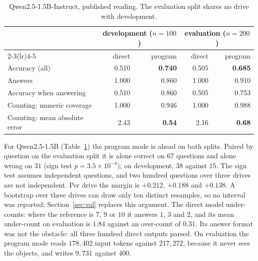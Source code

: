 \documentclass[11pt,a4paper]{article}
\begin{document}
\begin{table}[ht]
\centering
\small
\begin{tabular}{lrrrr}
\toprule
 & \multicolumn{2}{c}{development ($n{=}100$)} & \multicolumn{2}{c}{evaluation ($n{=}200$)} \\
\cmidrule(lr){2-3}\cmidrule(lr){4-5}
 & direct & program & direct & program \\
\midrule
Accuracy (all)            & 0.510 & \textbf{0.740} & 0.505 & \textbf{0.685} \\
Answers                   & 1.000 & 0.860 & 1.000 & 0.910 \\
Accuracy when answering   & 0.510 & 0.860 & 0.505 & 0.753 \\
Counting: numeric coverage & 1.000 & 0.946 & 1.000 & 0.988 \\
Counting: mean absolute error & 2.43  & \textbf{0.54} & 2.16 & \textbf{0.68} \\
\bottomrule
\end{tabular}
\caption{Qwen2.5-1.5B-Instruct, published reading. The evaluation split
shares no drive with development.}
\label{tab:ab}
\end{table}

For Qwen2.5-1.5B (Table~\ref{tab:ab}) the program mode is ahead on both
splits. Paired by question on the evaluation split it is alone correct on
$67$ questions and alone wrong on $31$ (sign test $p = 3.5\times10^{-4}$);
on development, $38$ against $15$. The sign test assumes independent
questions, and two hundred questions over three drives are not independent.
Per drive the margin is $+0.212$, $+0.188$ and $+0.138$. A bootstrap over
three drives can draw only ten distinct resamples, so no interval was
reported; Section~\ref{sec:val} replaces this argument. The direct model
under-counts: where the reference is $7$, $9$ or $10$ it answers $1$, $3$ and
$2$, and its mean under-count on evaluation is $1.84$ against an over-count
of $0.31$. Its answer format was not the obstacle: all three hundred direct
outputs parsed. On evaluation the program mode reads $178{,}402$ input
tokens against $217{,}272$, because it never sees the objects, and writes
$9{,}731$ against $400$.
\end{document}
